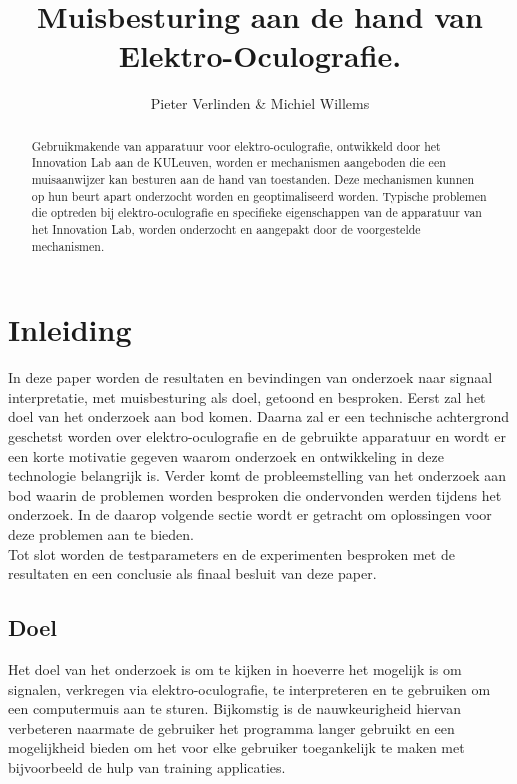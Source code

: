 \documentclass{article}
\title{Muisbesturing aan de hand van Elektro-Oculografie.}
\author{Pieter Verlinden \& Michiel Willems}
\begin{document}
\maketitle

\begin{abstract}
  Gebruikmakende van apparatuur voor elektro-oculografie, ontwikkeld door het Innovation Lab aan de KULeuven, worden er mechanismen aangeboden die een muisaanwijzer kan besturen aan de hand van toestanden. Deze mechanismen kunnen op hun beurt apart onderzocht worden en geoptimaliseerd worden. Typische problemen die optreden bij elektro-oculografie en specifieke eigenschappen van de apparatuur van het Innovation Lab, worden onderzocht en aangepakt door de voorgestelde mechanismen.
\end{abstract}

\section{Inleiding}
In deze paper worden de resultaten en bevindingen van onderzoek naar signaal interpretatie, met muisbesturing als doel, getoond en besproken. Eerst zal het doel van het onderzoek aan bod komen. Daarna zal er een technische achtergrond geschetst worden over elektro-oculografie en  de gebruikte apparatuur en wordt er een korte motivatie gegeven waarom onderzoek en ontwikkeling in deze technologie belangrijk is. Verder komt de probleemstelling van het onderzoek aan bod waarin de problemen worden besproken die ondervonden werden tijdens het onderzoek. In de daarop volgende sectie wordt er getracht om oplossingen voor deze problemen aan te bieden.\\
Tot slot worden de testparameters en de experimenten besproken met de resultaten en een conclusie als finaal besluit van deze paper. 
\subsection{Doel}
Het doel van het onderzoek is om te kijken in hoeverre het mogelijk is om signalen, verkregen via elektro-oculografie, te interpreteren en te gebruiken om een computermuis aan te sturen. Bijkomstig is de nauwkeurigheid hiervan verbeteren naarmate de gebruiker het programma langer gebruikt en een mogelijkheid bieden om het voor elke gebruiker toegankelijk te maken met bijvoorbeeld de hulp van training applicaties. 
\end{document}
